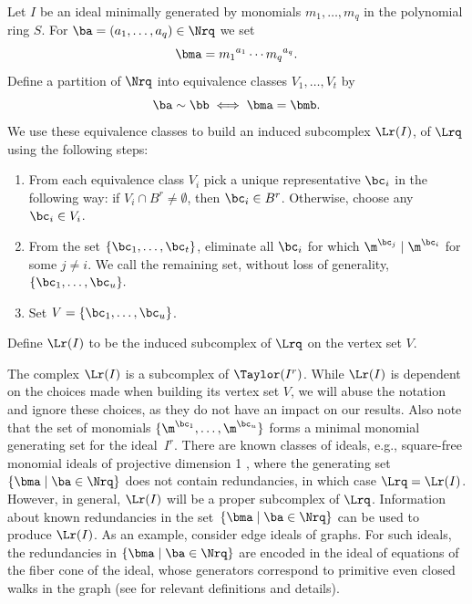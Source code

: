 \begin{defi}\label{d:LrI}
  Let $I$ be an ideal minimally generated by monomials
  $m_1,\ldots,m_q$ in the polynomial ring $S$. For $\ba = (a_1,
  \ldots, a_q) \in \Nrq$ we set
  $$\bma={m_1}^{a_1} \cdots {m_q}^{a_q}.$$ Define a partition of $\Nrq$
  into equivalence classes $V_1,\ldots,V_t$ by
  $$\ba \sim \bb \iff \bma=\bmb.$$
 We use these equivalence classes to build an induced subcomplex $\Lr(I)$, of $\Lrq$ using the following steps:
  \begin{enumerate}

  \item[Step 1.] From each equivalence class $V_i$ pick a unique
    representative $\bc_i$ in the following way: if $V_i \cap B^r \neq \emptyset$,
    then $\bc_i \in B^r$. Otherwise, choose any $\bc_i \in V_i$.
    
  \item[Step 2.]  From the set $\{\bc_1,\ldots,\bc_t\}$, eliminate all
    $\bc_i$ for which ${\m}^{\bc_j} \mid {\m}^{\bc_i}$ for some $j \neq
    i$. We call the remaining set, without loss of generality, $\{
    \bc_1,\ldots,\bc_u\}.$
  
  \item[Step 3.] Set $V=\{\bc_1,\ldots,\bc_u\}$.

  \end{enumerate}

 Define $\Lr(I)$ to be the induced subcomplex of $\Lrq$ on the
  vertex set $V$.
  \end{defi}

  The complex $\Lr(I)$ is a subcomplex of $\Taylor(I^r)$.  While
  $\Lr(I)$ is dependent on the choices made when building its vertex
  set $V$, we will abuse the notation and ignore these choices, as
  they do not have an impact on our results.  Also note that the set
  of monomials $\{ \m^{\bc _1},\ldots,\m^{\bc _u}\}$ forms a minimal
  monomial generating set for the ideal~$I^r$.  There are known
  classes of ideals, e.g., square-free monomial ideals of
  projective dimension 1 \cite[Proposition 4.1]{morse}, where
  the generating set $\{ \bma \mid \ba \in \Nrq\}$ does not contain
  redundancies, in which case $\Lrq = \Lr(I)$. However, in general,
  $\Lr(I)$ will be a proper subcomplex of $\Lrq$. Information about
  known redundancies in the set~$\{ \bma \mid \ba \in \Nrq\}$ can be used to
  produce $\Lr(I)$. As an example, consider edge ideals of graphs. For
  such ideals, the redundancies in $\{ \bma \mid \ba \in \Nrq\}$ are
  encoded in the ideal of equations of the fiber cone of the ideal,
  whose generators correspond to primitive even closed walks in the
  graph \textup{(}see \cite{villa} for relevant definitions and details\textup{)}.


